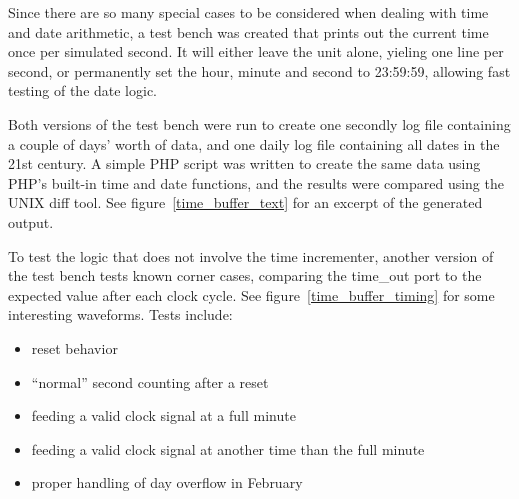 \documentclass[a4paper]{article}
\begin{document}
Since there are so many special cases to be considered when dealing with time
and date arithmetic, a test bench was created that prints out the current time
once per simulated second. It will either leave the unit alone, yieling one
line per second, or permanently set the hour, minute and second to 23:59:59,
allowing fast testing of the date logic.

Both versions of the test bench were run to create one secondly log file
containing a couple of days' worth of data, and one daily log file containing
all dates in the 21st century. A simple PHP script was written to create the
same data using PHP's built-in time and date functions, and the results were
compared using the UNIX diff tool. See figure~\ref{time_buffer_text} for an
excerpt of the generated output.

To test the logic that does not involve the time incrementer, another version
of the test bench tests known corner cases, comparing the time\_out port to the
expected value after each clock cycle. See figure~\ref{time_buffer_timing} for
some interesting waveforms. Tests include:

\begin{itemize}
	\item reset behavior
	\item ``normal'' second counting after a reset
	\item feeding a valid clock signal at a full minute
	\item feeding a valid clock signal at another time than the full minute
	\item proper handling of day overflow in February
\end{itemize}
\end{document}
